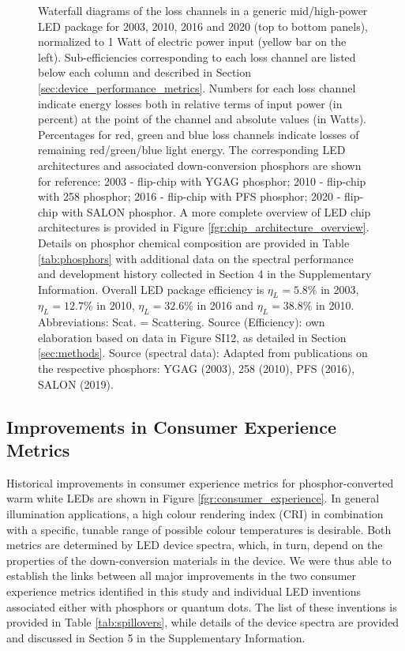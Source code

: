 \documentclass[journal=jacsat,manuscript=article]{achemso}
\begin{document}
\begin{figure}[h!]
 \caption{Waterfall diagrams of the loss channels in a generic mid/high-power LED package for 2003, 2010, 2016 and 2020 (top to bottom panels), normalized to 1 Watt of electric power input (yellow bar on the left). Sub-efficiencies corresponding to each loss channel are listed below each column and described in Section \ref{sec:device_performance_metrics}. Numbers for each loss channel indicate energy losses both in relative terms of input power (in percent) at the point of the channel and absolute values (in Watts). Percentages for red, green and blue loss channels indicate losses of remaining red/green/blue light energy. The corresponding LED architectures and associated down-conversion phosphors are shown for reference: 2003 - flip-chip with YGAG phosphor; 2010 - flip-chip with 258 phosphor; 2016 - flip-chip with PFS phosphor; 2020 - flip-chip with SALON phosphor. A more complete overview of LED chip architectures is provided in Figure \ref{fgr:chip_architecture_overview}. Details on phosphor chemical composition are provided in Table \ref{tab:phosphors} with additional data on the spectral performance and development history collected in Section 4 in the Supplementary Information. Overall LED package efficiency is $\eta_L = 5.8\%$ in 2003, $\eta_L = 12.7\%$ in 2010, $\eta_L = 32.6\%$ in 2016 and $\eta_L = 38.8\%$ in 2010. Abbreviations: Scat. = Scattering. Source (Efficiency): own elaboration based on data in Figure SI12, as detailed in Section \ref{sec:methods}. Source (spectral data): Adapted from publications on the respective phosphors: YGAG (2003)\cite{Mueller2002}, 258 (2010)\cite{MuellerMach2005}, PFS (2016)\cite{Murphy2015}, SALON (2019)\cite{Hoerder2019}.}
 \label{fgr:waterfall}
\end{figure}

\subsection{Improvements in Consumer Experience Metrics}

Historical improvements in consumer experience metrics for phosphor-converted warm white LEDs are shown in Figure \ref{fgr:consumer_experience}. In general illumination applications, a high colour rendering index (CRI) in combination with a specific, tunable range of possible colour temperatures is desirable. Both metrics are determined by LED device spectra, which, in turn, depend on the properties of the down-conversion materials in the device. We were thus able to establish the links between all major improvements in the two consumer experience metrics identified in this study and individual LED inventions associated either with phosphors or quantum dots. The list of these inventions is provided in Table \ref{tab:spillovers}, while details of the device spectra are provided and discussed in Section 5 in the Supplementary Information. 
\end{document}
